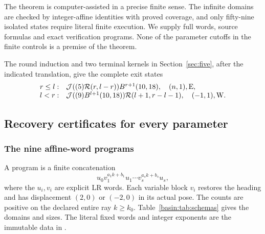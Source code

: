 The theorem is computer-assisted in a precise finite sense. The infinite
domains are checked by integer-affine identities with proved coverage, and
only fifty-nine isolated states require literal finite execution. We supply
full words, source formulas and exact verification programs. None of the
parameter cutoffs in the finite controls is a premise of the theorem.

The round induction and two terminal kernels in
Section~\ref{sec:five}, after the indicated translation, give the complete exit states
\begin{equation}
\begin{array}{ll}
r\le l:&\mathcal J((5)\mathcal R(r,l-r))B^{r+1}(10,18),\quad (n,1),\mathrm E,\\
l<r:&\mathcal J((9)B^{l+1}(10,18))\mathcal R(l+1,r-l-1),\quad (-1,1),\mathrm W.
\end{array}                                                    \label{basin:eq:exit}
\end{equation}
\subsection{Recovery certificates for every parameter}
\subsubsection{The nine affine-word programs}
A program is a finite concatenation
\begin{equation}
 u_0v_1^{a_1k+b_1}u_1\cdots v_s^{a_sk+b_s}u_s,             \label{basin:eq:program}
\end{equation}
where the $u_i,v_i$ are explicit LR words. Each variable block $v_i$ restores
the heading and has displacement $(2,0)$ or $(-2,0)$ in its actual pose. The
counts are positive on the declared entire ray $k\ge k_0$.
Table~\ref{basin:tab:schemas} gives the domains and sizes. The literal fixed words
and integer exponents are the immutable data in .

